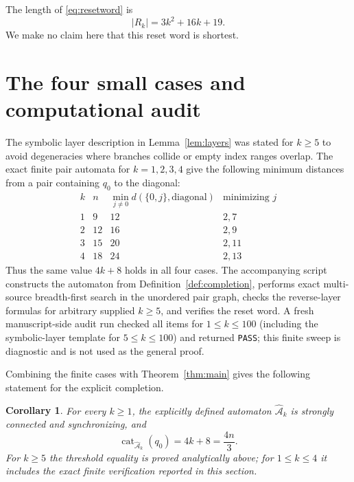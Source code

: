 \documentclass[11pt]{article}
\newtheorem{corollary}{Corollary}
\theoremstyle{definition}
\theoremstyle{remark}
\newcommand{\Ahat}{\widehat{\mathcal A}}
\newcommand{\cat}{\operatorname{cat}}
\begin{document}
The length of \eqref{eq:resetword} is
\[
 |R_k|=3k^2+16k+19.
\]
We make no claim here that this reset word is shortest.

\section{The four small cases and computational audit}
The symbolic layer description in Lemma~\ref{lem:layers} was stated for $k\ge5$ to avoid degeneracies where branches collide or empty index ranges overlap. The exact finite pair automata for $k=1,2,3,4$ give the following minimum distances from a pair containing $q_0$ to the diagonal:
\[
\begin{array}{c|c|c|c}
 k & n & \min_{j\ne0} d(\{0,j\},\text{diagonal}) & \text{minimizing }j\\
\hline
1&9&12&2,7\\
2&12&16&2,9\\
3&15&20&2,11\\
4&18&24&2,13
\end{array}
\]
Thus the same value $4k+8$ holds in all four cases. The accompanying script constructs the automaton from Definition~\ref{def:completion}, performs exact multi-source breadth-first search in the unordered pair graph, checks the reverse-layer formulas for arbitrary supplied $k\ge5$, and verifies the reset word. A fresh manuscript-side audit run checked all items for $1\le k\le100$ (including the symbolic-layer template for $5\le k\le100$) and returned \texttt{PASS}; this finite sweep is diagnostic and is not used as the general proof.

Combining the finite cases with Theorem~\ref{thm:main} gives the following statement for the explicit completion.

\begin{corollary}\label{cor:allk}
For every $k\ge1$, the explicitly defined automaton $\Ahat_k$ is strongly connected and synchronizing, and
\[
 \cat_{\Ahat_k}(q_0)=4k+8=\frac{4n}{3}.
\]
For $k\ge5$ the threshold equality is proved analytically above; for $1\le k\le4$ it includes the exact finite verification reported in this section.
\end{corollary}
\end{document}
